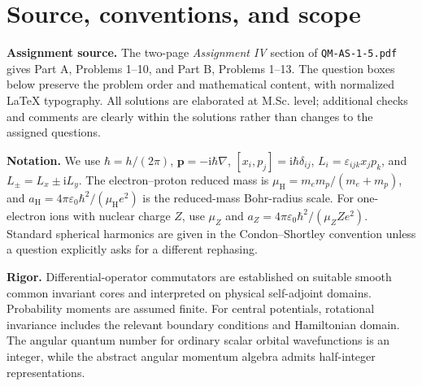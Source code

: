 \documentclass[11pt,a4paper]{article}
\newcommand{\iu}{\mathrm{i}}
\newcommand{\aH}{a_{\mathrm H}}
\newcommand{\mH}{\mu_{\mathrm H}}
\newcommand{\eps}{\varepsilon_0}
\begin{document}
\begin{abstract}
This complete mathematical-physics study manuscript presents all ten Part A problems and all thirteen Part B problems in SRMIST Quantum Mechanics--I Assignment IV. The questions are typeset from the provided course sheet and remain in their original order. The solutions follow the detailed first-principles derivations developed in the study discussion, with self-contained calculations, correct boundary conditions, Hilbert-space qualifications, explicit radial integrations, algebraic angular momentum calculations, and concise exam-ready conclusions. An analytic vector plot of the hydrogen radial probability density is included. The text is an edited LaTeX re-typesetting and synthesis, not a claim that every word of earlier chat answers has been reproduced verbatim. Where the printed sheet adopts a convention-dependent identity for spherical harmonics, the convention and standard alternative are both explained. This document is a pedagogical manuscript rather than an original research submission.
\end{abstract}
{\small\setlength{\parskip}{0pt}\tableofcontents}
\clearpage
\section{Source, conventions, and scope}
\textbf{Assignment source.} The two-page \emph{Assignment IV} section of \texttt{QM-AS-1-5.pdf} gives Part A, Problems 1--10, and Part B, Problems 1--13. The question boxes below preserve the problem order and mathematical content, with normalized LaTeX typography. All solutions are elaborated at M.Sc. level; additional checks and comments are clearly within the solutions rather than changes to the assigned questions.

\textbf{Notation.} We use \(\hbar=h/(2\pi)\), \(\mathbf p=-\iu\hbar\nabla\), \([x_i,p_j]=\iu\hbar\delta_{ij}\), \(L_i=\varepsilon_{ijk}x_jp_k\), and \(L_\pm=L_x\pm\iu L_y\). The electron--proton reduced mass is \(\mH=m_em_p/(m_e+m_p)\), and \(\aH=4\pi\eps\hbar^2/(\mH e^2)\) is the reduced-mass Bohr-radius scale. For one-electron ions with nuclear charge \(Z\), use \(\mu_Z\) and \(a_Z=4\pi\eps\hbar^2/(\mu_ZZe^2)\). Standard spherical harmonics are given in the Condon--Shortley convention unless a question explicitly asks for a different rephasing.

\textbf{Rigor.} Differential-operator commutators are established on suitable smooth common invariant cores and interpreted on physical self-adjoint domains. Probability moments are assumed finite. For central potentials, rotational invariance includes the relevant boundary conditions and Hamiltonian domain. The angular quantum number for ordinary scalar orbital wavefunctions is an integer, while the abstract angular momentum algebra admits half-integer representations.
\end{document}
